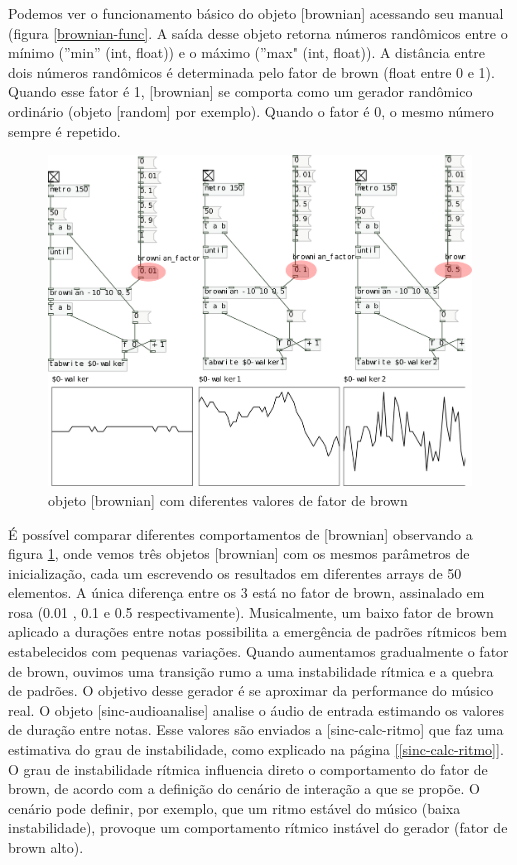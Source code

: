 \documentclass{ppgmus}
\begin{document}
Podemos ver o funcionamento básico do objeto [brownian] acessando seu
manual (figura \ref{brownian-func}.  A saída desse objeto retorna números randômicos entre o mínimo
(''min'' (int, float)) e o máximo (''max" (int, float)). A distância entre
dois números randômicos é determinada pelo fator de brown (float
entre 0 e 1). Quando esse fator é 1, [brownian] se comporta como um
gerador randômico ordinário (objeto [random] por exemplo). Quando
o fator é 0, o mesmo número sempre é repetido.


\begin{figure}
\includegraphics[scale=.6]{brownian-exemplo}
\caption{objeto [brownian] com diferentes valores de fator de brown}
\label{brownian-exemplo}
\end{figure} 

É possível comparar diferentes comportamentos de [brownian] observando
a figura \ref{brownian-exemplo}, onde vemos três objetos [brownian] com
os mesmos parâmetros de inicialização, cada um escrevendo os resultados
em diferentes arrays de 50 elementos. A única diferença entre os 3 está 
no fator de brown, assinalado em rosa (0.01 , 0.1 e 0.5 respectivamente).
Musicalmente, um baixo fator de brown aplicado a durações entre notas
possibilita a emergência de padrões rítmicos bem estabelecidos com 
pequenas variações. Quando aumentamos gradualmente o fator de brown, ouvimos
uma transição rumo a uma instabilidade rítmica e a quebra de padrões. 
O objetivo desse gerador é se aproximar da performance do músico real.
O objeto [sinc-audioanalise] analise o áudio de entrada estimando os valores de duração entre notas.
Esse valores são enviados a [sinc-calc-ritmo] que faz uma estimativa do grau
de instabilidade, como explicado na página \ref{[sinc-calc-ritmo]}.
O grau de instabilidade rítmica influencia direto o comportamento do fator de brown, de acordo
com a definição do cenário de interação a que se propõe. O cenário pode definir, por exemplo, que
um ritmo estável do músico (baixa instabilidade), provoque um comportamento rítmico instável
do gerador (fator de brown alto).
\end{document}
